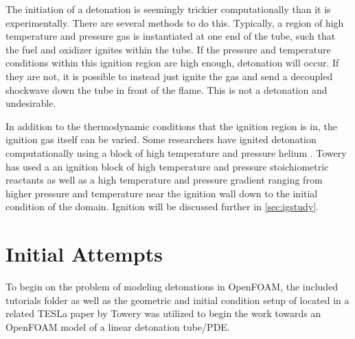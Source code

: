 The initiation of a detonation is seemingly trickier computationally than it is experimentally. There are several methods to do this. Typically, a region of high temperature and pressure gas is instantiated at one end of the tube, such that the fuel and oxidizer ignites within the tube. If the pressure and temperature conditions within this ignition region are high enough, detonation will occur. If they are not, it is possible to instead just ignite the gas and send a decoupled shockwave down the tube in front of the flame. This is not a detonation and undesirable. 

In addition to the thermodynamic conditions that the ignition region is in, the ignition gas itself can be varied. Some researchers have ignited detonation computationally using a block of high temperature and pressure helium \cite{marcantoni}. Towery has used a an ignition block of high temperature and pressure stoichiometric reactants \cite{towery1} as well as a high temperature and pressure gradient \cite{towery2} ranging from higher pressure and temperature near the ignition wall down to the initial condition of the domain. Ignition will be discussed further in \ref{sec:igstudy}.





\section{Initial Attempts}
To begin on the problem of modeling detonations in OpenFOAM, the included tutorials folder as well as the geometric and initial condition setup of located in a related TESLa paper by Towery\cite{towery1} was utilized to begin the work towards an OpenFOAM model of a linear detonation tube/PDE.

